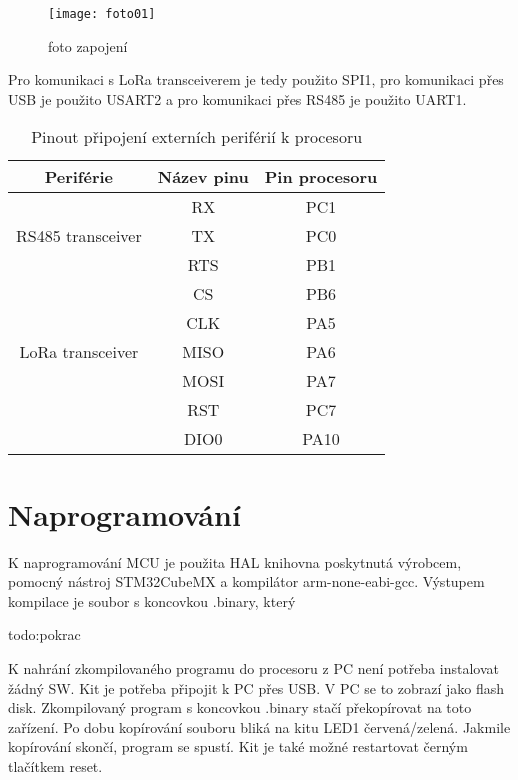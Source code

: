 \begin{figure}[!h]
    \centering
    \texttt{[image: foto01]}
    \caption{foto zapojení}
    \label{fig:03}
\end{figure}

Pro komunikaci s LoRa transceiverem je tedy použito SPI1, pro komunikaci přes USB je použito USART2 a pro komunikaci přes RS485 je použito UART1.

\begin{table}[h]
    \centering
    \begin{tabular}{ |c|c|c| }
     \hline

     Periférie          & Název pinu & Pin procesoru           \\ \hline \hline
     
                        & RX  &   PC1            \\
    RS485 transceiver   & TX  &   PC0       \\
                        & RTS  &  PB1      \\     \hline

                        & CS    &  PB6             \\
                        & CLK   &  PA5        \\
   LoRa transceiver     & MISO  &  PA6     \\
                        & MOSI  &  PA7        \\
                        & RST   & PC7          \\
                        & DIO0  & PA10         \\
                        \hline

    \end{tabular}
    \caption{Pinout připojení externích periférií k procesoru}
    \label{table:3}
\end{table}


\section{Naprogramování}
K naprogramování MCU je použita HAL knihovna poskytnutá výrobcem, pomocný nástroj STM32CubeMX a kompilátor arm-none-eabi-gcc. Výstupem kompilace je soubor s koncovkou .binary, který 

todo:pokrac


K nahrání zkompilovaného programu do procesoru z PC není potřeba instalovat žádný SW. 
Kit je potřeba připojit k PC přes USB. V PC se to zobrazí jako flash disk. Zkompilovaný program s koncovkou .binary stačí překopírovat na toto zařízení. Po dobu kopírování souboru bliká na kitu LED1 červená/zelená. Jakmile kopírování skončí, program se spustí. Kit je také možné restartovat černým tlačítkem reset.

